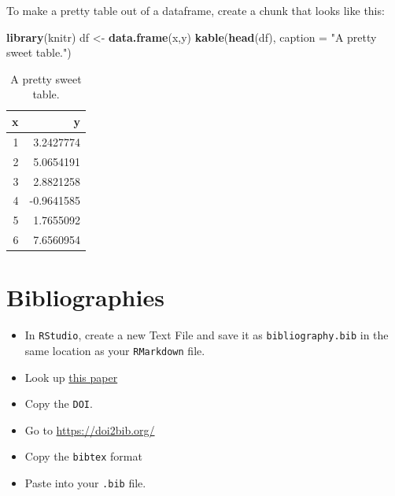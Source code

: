 \documentclass[]{book}
\newenvironment{Shaded}{\begin{snugshade}}{\end{snugshade}}
\newcommand{\DataTypeTok}[1]{\textcolor[rgb]{0.13,0.29,0.53}{#1}}
\newcommand{\KeywordTok}[1]{\textcolor[rgb]{0.13,0.29,0.53}{\textbf{#1}}}
\newcommand{\NormalTok}[1]{#1}
\newcommand{\StringTok}[1]{\textcolor[rgb]{0.31,0.60,0.02}{#1}}
\begin{document}
To make a pretty table out of a dataframe, create a chunk that looks like this:

\begin{Shaded}
\begin{Highlighting}[]
\KeywordTok{library}\NormalTok{(knitr)}
\NormalTok{df <-}\StringTok{ }\KeywordTok{data.frame}\NormalTok{(x,y)}
\KeywordTok{kable}\NormalTok{(}\KeywordTok{head}\NormalTok{(df), }\DataTypeTok{caption =} \StringTok{"A pretty sweet table."}\NormalTok{)}
\end{Highlighting}
\end{Shaded}

\begin{table}

\caption{\label{tab:unnamed-chunk-362}A pretty sweet table.}
\centering
\begin{tabular}[t]{r|r}
\hline
x & y\\
\hline
1 & 3.2427774\\
\hline
2 & 5.0654191\\
\hline
3 & 2.8821258\\
\hline
4 & -0.9641585\\
\hline
5 & 1.7655092\\
\hline
6 & 7.6560954\\
\hline
\end{tabular}
\end{table}

\hypertarget{bibliographies}{%
\section*{Bibliographies}\label{bibliographies}}

\begin{itemize}
\item
  In \texttt{RStudio}, create a new Text File and save it as \texttt{bibliography.bib} in the same location as your \texttt{RMarkdown} file.
\item
  Look up \href{https://www.researchgate.net/publication/260642613_Statistical_exponential_formulas_for_homogeneous_diffusion}{this paper}
\item
  Copy the \texttt{DOI}.
\item
  Go to \url{https://doi2bib.org/}
\item
  Copy the \texttt{bibtex} format
\item
  Paste into your \texttt{.bib} file.
\end{itemize}
\end{document}
